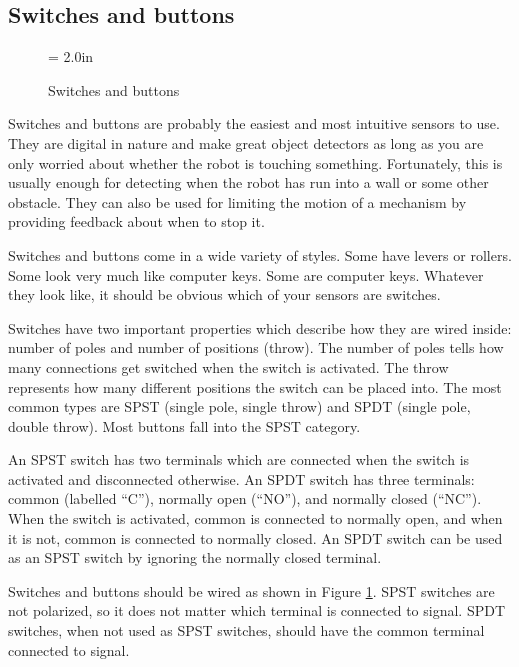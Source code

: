 \subsection{Switches and buttons}

\begin{figure}[htbp]
 \centerline{\epsfysize = 2.0in}
 \caption{Switches and buttons}
 \label{switches}
\end{figure}

Switches and buttons are probably the easiest and most intuitive
sensors to use. They are digital in nature and make great object
detectors as long as you are only worried about whether the robot is
touching something. Fortunately, this is usually enough for detecting
when the robot has run into a wall or some other obstacle. They can
also be used for limiting the motion of a mechanism by providing
feedback about when to stop it.

Switches and buttons come in a wide variety of styles. Some have
levers or rollers. Some look very much like computer keys. Some are
computer keys. Whatever they look like, it should be obvious which of
your sensors are switches.

Switches have two important properties which describe how they are
wired inside: number of poles and number of positions (throw). The
number of poles tells how many connections get switched when the
switch is activated. The throw represents how many different positions
the switch can be placed into. The most common types are SPST (single
pole, single throw) and SPDT (single pole, double throw). Most buttons
fall into the SPST category.

An SPST switch has two terminals which are connected when the switch
is activated and disconnected otherwise. An SPDT switch has three
terminals: common (labelled ``C''), normally open (``NO''), and
normally closed (``NC''). When the switch is activated, common is
connected to normally open, and when it is not, common is connected to
normally closed. An SPDT switch can be used as an SPST switch by
ignoring the normally closed terminal.

Switches and buttons should be wired as shown in Figure
\ref{switches}. SPST switches are not polarized, so it does not matter
which terminal is connected to signal. SPDT switches, when not used as
SPST switches, should have the common terminal connected to signal.
